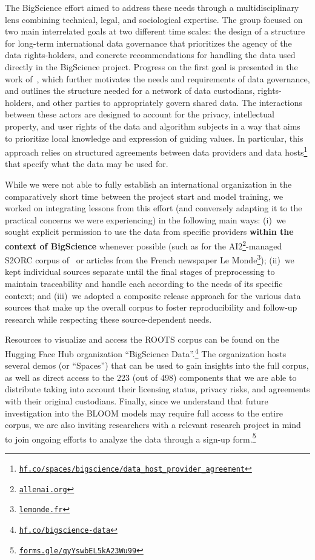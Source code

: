 The BigScience effort aimed to address these needs through a multidisciplinary lens combining technical, legal, and sociological expertise. The group focused on two main interrelated goals at two different time scales: the design of a structure for long-term international data governance that prioritizes the agency of the data rights-holders, and concrete recommendations for handling the data used directly in the BigScience project. Progress on the first goal is presented in the work of~\citet{jernite2022data}, which further motivates the needs and requirements of data governance, and outlines the structure needed for a network of data custodians, rights-holders, and other parties to appropriately govern shared data. The interactions between these actors are designed to account for the privacy, intellectual property, and user rights of the data and algorithm subjects in a way that aims to prioritize local knowledge and expression of guiding values. In particular, this approach relies on structured agreements between data providers and data hosts\footnote{\href{https://hf.co/spaces/bigscience/data_host_provider_agreement}{\texttt{hf.co/spaces/bigscience/data\_host\_provider\_agreement}}} that specify what the data may be used for.

While we were not able to fully establish an international organization in the comparatively short time between the project start and model training, we worked on integrating lessons from this effort (and conversely adapting it to the practical concerns we were experiencing) in the following main ways: (i)~we sought explicit permission to use the data from specific providers \textbf{within the context of BigScience} whenever possible (such as for the AI2\footnote{\href{https://allenai.org/}{\texttt{allenai.org}}}-managed S2ORC corpus of~\citet{lo2020s2orc} or articles from the French newspaper Le Monde\footnote{\href{https://www.lemonde.fr/}{\texttt{lemonde.fr}}}); (ii)~we kept individual sources separate until the final stages of preprocessing to maintain traceability and handle each according to the needs of its specific context; and (iii)~we adopted a composite release approach for the various data sources that make up the overall corpus to foster reproducibility and follow-up research while respecting these source-dependent needs.

Resources to visualize and access the ROOTS corpus can be found on the Hugging Face Hub organization ``BigScience Data''.\footnote{\href{https://hf.co/bigscience-data}{\texttt{hf.co/bigscience-data}}} The organization hosts several demos (or ``Spaces'') that can be used to gain insights into the full corpus, as well as direct access to the 223 (out of 498) components that we are able to distribute taking into account their licensing status, privacy risks, and agreements with their original custodians. Finally, since we understand that future investigation into the BLOOM models may require full access to the entire corpus, we are also inviting researchers with a relevant research project in mind to join ongoing efforts to analyze the data through a sign-up form.\footnote{\href{https://forms.gle/qyYswbEL5kA23Wu99}{{\texttt{forms.gle/qyYswbEL5kA23Wu99}}}}

